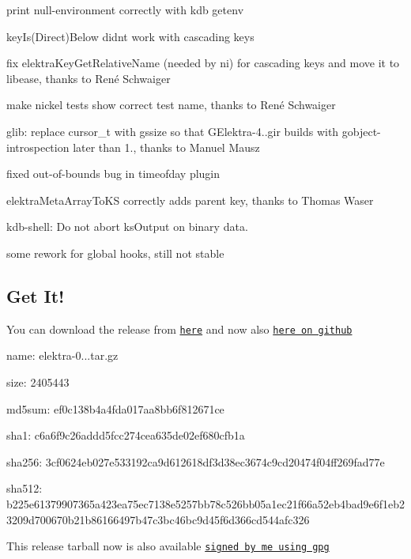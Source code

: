 \begin{DoxyItemize}
\item print null-\/environment correctly with {\ttfamily kdb getenv}
\item key\+Is(\+Direct)Below didn\textquotesingle{}t work with cascading keys
\item fix elektra\+Key\+Get\+Relative\+Name (needed by ni) for cascading keys and move it to libease, thanks to René Schwaiger
\item make nickel tests show correct test name, thanks to René Schwaiger
\item glib\+: replace cursor\+\_\+t with gssize so that G\+Elektra-\/4..\+gir builds with gobject-\/introspection later than 1., thanks to Manuel Mausz
\item fixed out-\/of-\/bounds bug in timeofday plugin
\item elektra\+Meta\+Array\+To\+KS correctly adds parent key, thanks to Thomas Waser
\item kdb-\/shell\+: Do not abort ks\+Output on binary data.
\item some rework for global hooks, still not stable
\end{DoxyItemize}

\subsection*{Get It!}

You can download the release from \href{https://www.libelektra.org/ftp/elektra/releases/elektra-0.8.16.tar.gz}{\tt here} and now also \href{https://github.com/ElektraInitiative/ftp/tree/master/releases/elektra-0.8.16.tar.gz}{\tt here on github}


\begin{DoxyItemize}
\item name\+: elektra-\/0...\+tar.\+gz
\item size\+: 2405443
\item md5sum\+: ef0c138b4a4fda017aa8bb6f812671ce
\item sha1\+: c6a6f9c26addd5fcc274cea635de02ef680cfb1a
\item sha256\+: 3cf0624eb027e533192ca9d612618df3d38ec3674c9cd20474f04ff269fad77e
\item sha512\+: b225e61379907365a423ea75ec7138e5257bb78c526bb05a1ec21f66a52eb4bad9e6f1eb23209d700670b21b86166497b47c3bc46bc9d45f6d366cd544afc326
\end{DoxyItemize}

This release tarball now is also available \href{https://www.libelektra.org/ftp/elektra/releases/elektra-0.8.16.tar.gz.gpg}{\tt signed by me using gpg}

